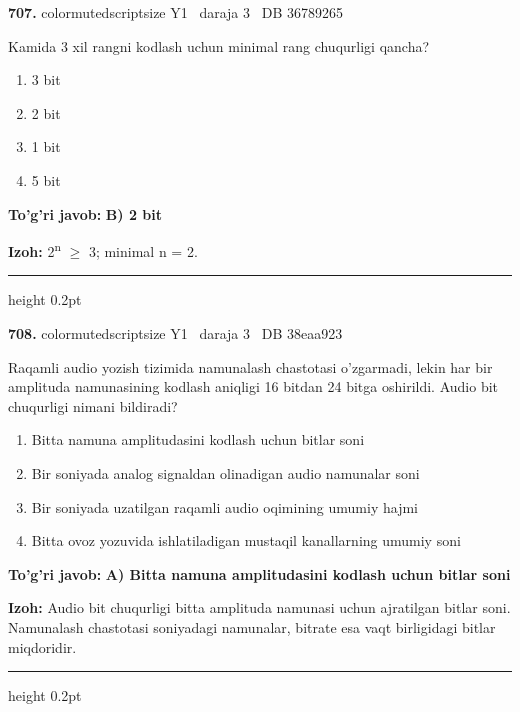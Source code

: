 \documentclass[10pt,a4paper,oneside]{article}
\begin{document}
\noindent\textbf{\color{ink}707.}  {color{muted}scriptsize Y1 \textbullet\ daraja 3 \textbullet\ DB 36789265}
\par
Kamida 3 xil rangni kodlash uchun minimal rang chuqurligi qancha?
\begin{enumerate}[label=\Alph*),leftmargin=9mm]
\item 3 bit
\item 2 bit
\item 1 bit
\item 5 bit
\end{enumerate}
\begin{tcolorbox}[enhanced,breakable,colback=teal!4,colframe=teal!50!black,boxrule=0.5pt,arc=1.1mm,left=3mm,right=3mm,top=1.7mm,bottom=1.7mm,before skip=2mm,after skip=2mm]
\textbf{\color{teal}To'g'ri javob:} \textbf{B) 2 bit}
\par\smallskip
\textbf{Izoh:} 2\textsuperscript{n} \ensuremath{\geq} 3; minimal n = 2.
\end{tcolorbox}
\vspace{2mm}\hrule height 0.2pt \vspace{3mm}

\noindent\textbf{\color{ink}708.}  {color{muted}scriptsize Y1 \textbullet\ daraja 3 \textbullet\ DB 38eaa923}
\par
Raqamli audio yozish tizimida namunalash chastotasi o'zgarmadi, lekin har bir amplituda namunasining kodlash aniqligi 16 bitdan 24 bitga oshirildi. Audio bit chuqurligi nimani bildiradi?
\begin{enumerate}[label=\Alph*),leftmargin=9mm]
\item Bitta namuna amplitudasini kodlash uchun bitlar soni
\item Bir soniyada analog signaldan olinadigan audio namunalar soni
\item Bir soniyada uzatilgan raqamli audio oqimining umumiy hajmi
\item Bitta ovoz yozuvida ishlatiladigan mustaqil kanallarning umumiy soni
\end{enumerate}
\begin{tcolorbox}[enhanced,breakable,colback=teal!4,colframe=teal!50!black,boxrule=0.5pt,arc=1.1mm,left=3mm,right=3mm,top=1.7mm,bottom=1.7mm,before skip=2mm,after skip=2mm]
\textbf{\color{teal}To'g'ri javob:} \textbf{A) Bitta namuna amplitudasini kodlash uchun bitlar soni}
\par\smallskip
\textbf{Izoh:} Audio bit chuqurligi bitta amplituda namunasi uchun ajratilgan bitlar soni. Namunalash chastotasi soniyadagi namunalar, bitrate esa vaqt birligidagi bitlar miqdoridir.
\end{tcolorbox}
\vspace{2mm}\hrule height 0.2pt \vspace{3mm}
\end{document}
